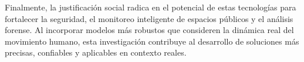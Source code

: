 Finalmente, la justificación social radica en el potencial de estas tecnologías para fortalecer la seguridad, el monitoreo inteligente de espacios públicos y el análisis forense. Al incorporar modelos más robustos que consideren la dinámica real del movimiento humano, esta investigación contribuye al desarrollo de soluciones más precisas, confiables y aplicables en contexto reales. 


